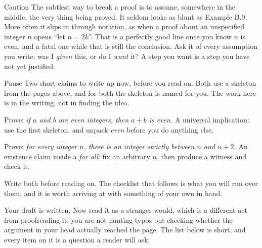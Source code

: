 \documentclass[a4paper,12pt,oneside]{memoir}
\begin{document}
\begin{envcaution}{Caution}{}{}
The subtlest way to break a proof is to assume, somewhere in the middle, the very thing being proved. It seldom looks as blunt as Example B.9. More often it slips in through notation, as when a proof about an unspecified integer \(n\) opens “let \(n = 2k\)”. That is a perfectly good line once you know \(n\) is even, and a fatal one while that is still the conclusion. Ask it of every assumption you write: was I \emph{given} this, or do I \emph{want} it? A step you want is a step you have not yet justified.
\end{envcaution}
\begin{envremark}{Pause}{}{}
Two short claims to write up now, before you read on. Both use a skeleton from the pages above, and for both the skeleton is named for you. The work here is in the writing, not in finding the idea.

\begin{steps}
  \item Prove: \emph{if \(a\) and \(b\) are even integers, then \(a + b\) is even.} A universal implication: use the first skeleton, and unpack \emph{even} before you do anything else.
  \item Prove: \emph{for every integer \(n\), there is an integer strictly between \(n\) and \(n + 2\).} An existence claim inside a \emph{for all}: fix an arbitrary \(n\), then produce a witness and check it.
\end{steps}
Write both before reading on. The checklist that follows is what you will run over them, and it is worth arriving at with something of your own in hand.
\end{envremark}
Your draft is written. Now read it as a stranger would, which is a different act from proofreading it: you are not hunting typos but checking whether the argument in your head actually reached the page. The list below is short, and every item on it is a question a reader will ask.
\end{document}
